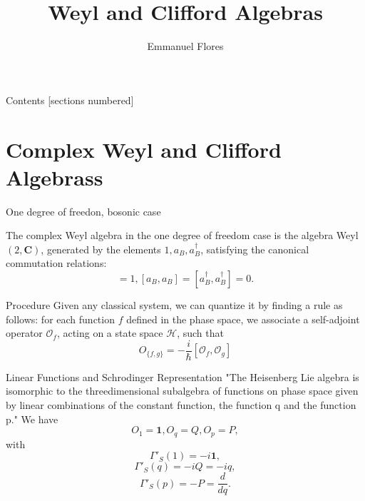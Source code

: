 \documentclass[12pt]{beamer}
\title{Weyl and Clifford Algebras}
\author{Emmanuel Flores}
\institute{Advanced Mathematical Methods, \\Tufts University}
\begin{document}
\maketitle
\begin{frame}{Contents}
	[sections numbered]
	\tableofcontents
\end{frame}
\section[Complex Weyl and Clifford Algebrass]{Complex Weyl and Clifford Algebrass}
\begin{frame}{One degree of freedon, bosonic case}
\begin{definition}
	The complex Weyl algebra in the one degree of freedom case is the algebra Weyl$(2, \mathbf{C})$, generated by the elements $1, a_{B}, a_{B}^{\dagger}$, satisfying the canonical commutation relations:
\begin{displaymath}
  [a_{B}, a_{B}^{\dagger}] = 1, [a_{B}, a_{B}] = [a_{B}^{\dagger}, a_{B}^{\dagger}]=0.
\end{displaymath}

\end{definition}
\end{frame}

\begin{frame}{Procedure}
Given any classical system, we can quantize it by finding a rule as follows: for each function $f$ defined in the phase space, we associate a self-adjoint operator $\mathcal{O}_{f}$, acting on a state space $\mathcal{H}$, such that 
\begin{displaymath}
  O_{\{f,g\}} = -\frac{i}{\hbar}\left[ \mathcal{O}_f, \mathcal{O}_g\right]
\end{displaymath}
\end{frame}

\begin{frame}{Linear Functions and Schrodinger Representation}
"The Heisenberg Lie algebra is isomorphic to the threedimensional subalgebra of functions on phase space given by linear combinations of the constant function, the function q and the function p."
We have
\begin{displaymath}
  O_1 = \mathbf{1}, O_q = Q, O_p = P,
\end{displaymath}
with
\begin{displaymath}
  \Gamma'_{S}(1)=-i\mathbf{1},
\end{displaymath}
\begin{displaymath}
  \Gamma'_{S}(q) = -iQ = -iq,
\end{displaymath}
\begin{displaymath}
    \Gamma'_{S}(p) = -P=\frac{d}{dq}.
\end{displaymath}
\end{frame}
\end{document}
